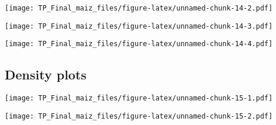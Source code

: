 \documentclass[
]{article}
\newenvironment{Shaded}{\begin{snugshade}}{\end{snugshade}}
\newcommand{\FunctionTok}[1]{\textcolor[rgb]{0.13,0.29,0.53}{\textbf{#1}}}
\newcommand{\NormalTok}[1]{#1}
\newcommand{\SpecialCharTok}[1]{\textcolor[rgb]{0.81,0.36,0.00}{\textbf{#1}}}
\begin{document}
\texttt{[image: TP\_Final\_maiz\_files/figure-latex/unnamed-chunk-14-2.pdf]}

\begin{Shaded}
\end{Shaded}

\texttt{[image: TP\_Final\_maiz\_files/figure-latex/unnamed-chunk-14-3.pdf]}

\begin{Shaded}
\end{Shaded}

\texttt{[image: TP\_Final\_maiz\_files/figure-latex/unnamed-chunk-14-4.pdf]}

\hypertarget{density-plots}{%
\subsection{Density plots}\label{density-plots}}

\begin{Shaded}
\end{Shaded}

\texttt{[image: TP\_Final\_maiz\_files/figure-latex/unnamed-chunk-15-1.pdf]}

\begin{Shaded}
\end{Shaded}

\texttt{[image: TP\_Final\_maiz\_files/figure-latex/unnamed-chunk-15-2.pdf]}

\begin{Shaded}
\end{Shaded}
\end{document}
